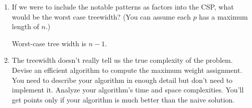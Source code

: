 \documentclass[10pt]{article}
\begin{document}
\begin{enumerate}[label=(\alph*)]

  \item If we were to include the notable patterns as factors into the CSP, what would be the worst case treewidth? (You can assume each $p$ has a maximum length of $n$.)
  
  \begin{center}
	\end{center}
	
	Worst-case tree width is $n - 1$.
  
  \item The treewidth doesn't really tell us the true complexity of the problem. Devise an efficient algorithm to compute the maximum weight assignment. You need to describe your algorithm in enough detail but don't need to implement it. Analyze your algorithm's time and space complexities. You'll get points only if your algorithm is much better than the naive solution.
		
\end{enumerate}
\fi
\end{document}
